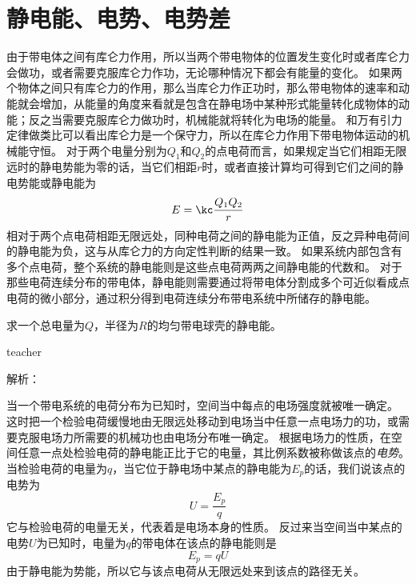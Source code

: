 \section{静电能、电势、电势差}
由于带电体之间有库仑力作用，所以当两个带电物体的位置发生变化时或者库仑力会做功，或者需要克服库仑力作功，无论哪种情况下都会有能量的变化。
如果两个物体之间只有库仑力的作用，那么当库仑力作正功时，那么带电物体的速率和动能就会增加，从能量的角度来看就是包含在静电场中某种形式能量转化成物体的动能；反之当需要克服库仑力做功时，机械能就将转化为电场的能量。
和万有引力定律做类比可以看出库仑力是一个保守力，所以在库仑力作用下带电物体运动的机械能守恒。
对于两个电量分别为$Q_1$和$Q_2$的点电荷而言，如果规定当它们相距无限远时的静电势能为零的话，当它们相距$r$时，或者直接计算均可得到它们之间的静电势能或静电能为
\begin{equation}
E = \kc \frac{Q_1Q_2}{ r}
\end{equation}
相对于两个点电荷相距无限远处，同种电荷之间的静电能为正值，反之异种电荷间的静电能为负，这与从库仑力的方向定性判断的结果一致。
如果系统内部包含有多个点电荷，整个系统的静电能则是这些点电荷两两之间静电能的代数和。
对于那些电荷连续分布的带电体，静电能则需要通过将带电体分割成多个可近似看成点电荷的微小部分，通过积分得到电荷连续分布带电系统中所储存的静电能。




\begin{example}
求一个总电量为$Q$，半径为$R$的均匀带电球壳的静电能。
\begin{taggedblock}{teacher}

解析：
\end{taggedblock}
\end{example}

当一个带电系统的电荷分布为已知时，空间当中每点的电场强度就被唯一确定。
这时把一个检验电荷缓慢地由无限远处移动到电场当中任意一点电场力的功，或需要克服电场力所需要的机械功也由电场分布唯一确定。
根据电场力的性质，在空间任意一点处检验电荷的静电能正比于它的电量，其比例系数被称做该点的\emph{电势}。
当检验电荷的电量为$q$，当它位于静电场中某点的静电能为$E_p$的话，我们说该点的电势为
\begin{equation}
 U = \frac{E_p}{q}
\end{equation}
它与检验电荷的电量无关，代表着是电场本身的性质。
反过来当空间当中某点的电势$U$为已知时，电量为$q$的带电体在该点的静电能则是
\begin{equation}
E_p = q U
\end{equation}
由于静电能为势能，所以它与该点电荷从无限远处来到该点的路径无关。

